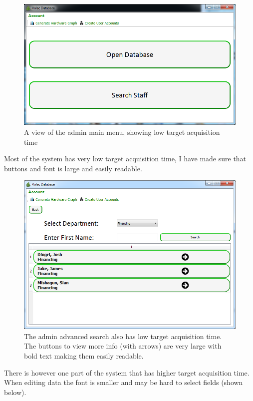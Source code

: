 \begin{figure}[H]
    \includegraphics[width=\textwidth]{./Maintenance/Images/adminmainmenu.png}
    \caption{A view of the admin main menu, showing low target acquisition time} 
\end{figure}

Most of the system has very low target acquisition time, I have made sure that buttons and font is large and easily readable. 

\begin{figure}[H]
    \includegraphics[width=\textwidth]{./Evaluation/Images/beforeadv.png}
    \caption{The admin advanced search also has low target acquisition time. The buttons to view more info (with arrows) are very large with bold text making them easily readable.} 
\end{figure}

There is however one part of the system that has higher target acquisition time. When editing data the font is smaller and may be hard to select fields (shown below).

